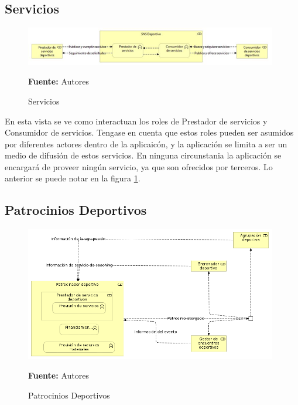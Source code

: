 \subsection{Servicios}

\begin{figure}[!htb]
  \begin{center}
    \includegraphics[width=11cm]{./imagenes/Archimate/vistas/business_functions/Servicios.png}
    \caption{Servicios}
    \label{fig:BF_Servicios}
    \textbf{Fuente:}  Autores \\
  \end{center}
\end{figure}

En esta vista se ve como interactuan los roles de Prestador de servicios y Consumidor de servicios. Tengase en cuenta que estos roles pueden ser asumidos por diferentes actores dentro de la aplicaicón, y la aplicación se limita a ser un medio de difusión de estos servicios. En ninguna circunstania la aplicación se encargará de proveer ningún servicio, ya que son ofrecidos por terceros. Lo anterior se puede notar en la figura \ref{fig:BF_Servicios}.

\subsection{Patrocinios Deportivos}

\begin{figure}[!htb]
  \begin{center}
    \includegraphics[width=11cm]{./imagenes/Archimate/vistas/business_functions/patrociniosdeportivos.png}
    \caption{Patrocinios Deportivos}
    \label{fig:bf_patrocinios_deportivos}
    \textbf{Fuente:}  Autores \\
  \end{center}
\end{figure}

